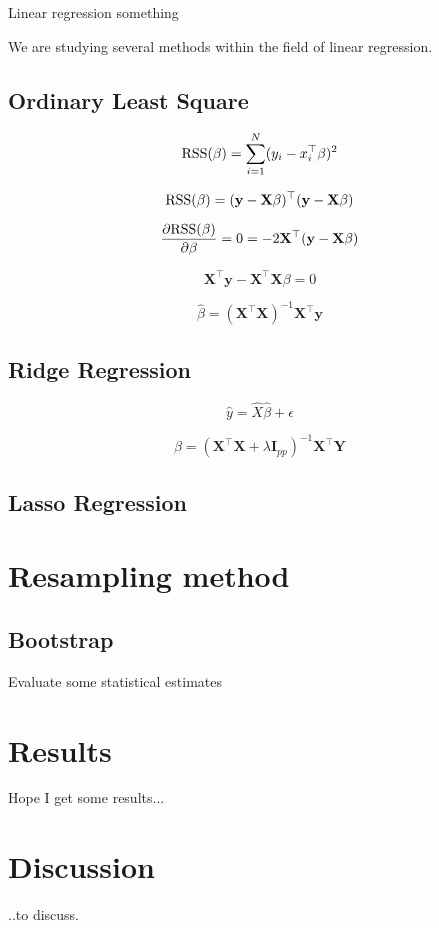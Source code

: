 \documentclass[a4paper,12pt, english]{article}
\begin{document}
Linear regression something

We are studying several methods within the field of linear regression.

\subsection*{Ordinary Least Square}

\begin{equation}
\textnormal{RSS}(\beta) = \sum_{i=1}^{N} (y_i - x_i^{\top}\beta)^2
\end{equation}

\begin{equation}
\textnormal{RSS}(\beta) = (\mathbf{y} - \mathbf{X}\beta)^{\top}(\mathbf{y} - \mathbf{X}\beta)
\end{equation}

\begin{equation}
\frac{\partial \textnormal{RSS}(\beta)}{\partial \beta} = 0 = -2 \mathbf{X}^{\top}(\mathbf{y} - \mathbf{X}\beta)
\end{equation}

\begin{equation}
\mathbf{X}^{\top}\mathbf{y} - \mathbf{X}^{\top}\mathbf{X} \beta = 0
\end{equation}

\begin{equation}
\hat{\beta} = (\mathbf{X}^{\top}\mathbf{X})^{-1}\mathbf{X}^{\top}\mathbf{y}
\end{equation}

\subsection*{Ridge Regression}

\begin{equation}
\hat{y} = \hat{X} \hat{\beta} + \epsilon
\end{equation}

\begin{equation}
\hat{\beta} = (\mathbf{X}^{\top}\mathbf{X} + \lambda\mathbf{I}_{pp})^{-1}\mathbf{X}^{\top}\mathbf{Y}
\end{equation}

\subsection*{Lasso Regression}


\section*{Resampling method}



\subsection*{Bootstrap}

Evaluate some statistical estimates

\section*{Results}

Hope I get some results...

\section*{Discussion}

..to discuss. 
\end{document}
